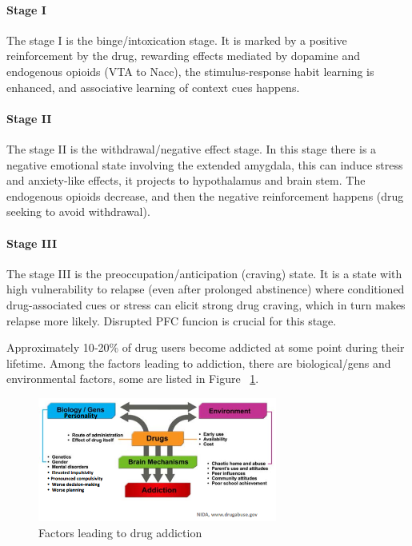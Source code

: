 \documentclass[12pt,article,oneside,a4paper]{memoir}
\begin{document}
\paragraph{Stage I}
The stage I is the binge/intoxication stage. It is marked by a positive reinforcement by the drug, rewarding effects mediated by dopamine and endogenous opioids (VTA to Nacc), the stimulus-response habit learning is enhanced, and associative learning of context cues happens.

\paragraph{Stage II}
The stage II is the withdrawal/negative effect stage. In this stage there is a negative emotional state involving the extended amygdala, this can induce stress and anxiety-like effects, it projects to hypothalamus and brain stem. The endogenous opioids decrease, and then the negative reinforcement happens (drug seeking to avoid withdrawal).

\paragraph{Stage III}
The stage III is the preoccupation/anticipation (craving) state. It is a state with high vulnerability to relapse (even after prolonged abstinence) where conditioned drug-associated cues or stress can elicit strong drug craving, which in turn makes relapse more likely. Disrupted PFC funcion is crucial for this stage.

Approximately 10‐20\% of drug users become addicted at some point during their lifetime. Among the factors leading to addiction, there are biological/gens and environmental factors, some are listed in Figure ~\ref{fig:drug-addiction-factors}.

\begin{figure}
  \centering
  \includegraphics[width=0.7\textwidth]{imgs/drug-addiction-factors.png}
  \caption{Factors leading to drug addiction}
  \label{fig:drug-addiction-factors}
\end{figure}
\end{document}
